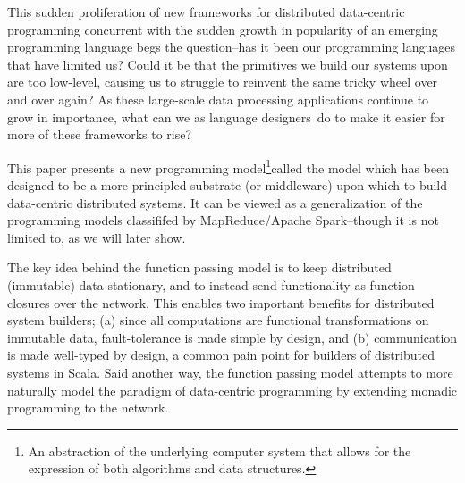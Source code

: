 \documentclass{jfp1}
\begin{document}

This sudden proliferation of new frameworks for distributed data-centric
programming concurrent with the sudden growth in popularity of an emerging
programming language begs the question--has it been our programming languages
that have limited us? Could it be that the primitives we build our systems upon
are too low-level, causing us to struggle to reinvent the same tricky wheel over
and over again? As these large-scale data processing applications continue to
grow in importance, what can we as language designers~do to make it easier for
more of these frameworks to rise?

This paper presents a new programming model\footnote{An abstraction of the
underlying computer system that allows for the expression of both algorithms and
data structures.}called the {\FP} model which has been designed to be a more
principled substrate (or middleware) upon which to build data-centric
distributed systems. It can be viewed as a generalization of the programming
models classififed by MapReduce/Apache Spark--though it is not limited to, as we
will later show.


The key idea behind the function passing model is to keep distributed
(immutable) data stationary, and to instead send functionality as function
closures over the network. This enables two important benefits for distributed
system builders; (a) since all computations are functional transformations on
immutable data, fault-tolerance is made simple by design, and (b) communication
is made well-typed by design, a common pain point for builders of distributed
systems in Scala. Said another way, the function passing model attempts to more
naturally model the paradigm of data-centric programming by extending monadic
programming to the network.
\end{document}

